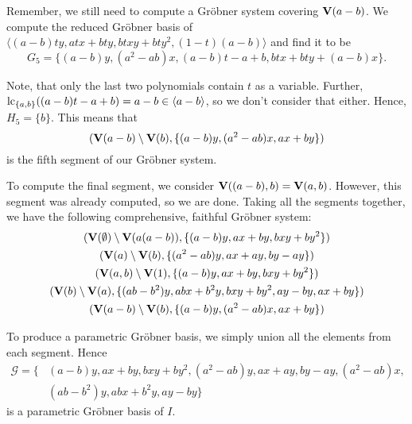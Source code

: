\begin{example}
  Remember, we still need to compute a Gröbner system covering $\operatorname{\mathbf V}(a - b)$. We compute the reduced Gröbner basis of $\langle (a - b)ty, atx + bty, btxy + bty^{2}, (1 - t)(a - b) \rangle$ and find it to be
  \[G_{5} = \{ (a - b)y, (a^2 - ab)x, (a - b)t - a + b, btx + bty + (a - b)x \}.\]

  Note, that only the last two polynomials contain $t$ as a variable. Further, $\operatorname{lc}_{\{a, b\}}((a - b)t - a + b) = a - b \in \langle a - b \rangle$, so we don't consider that either. Hence, $H_{5} = \{b\}$. This means that
  \[(\operatorname{\mathbf V}(a - b) \setminus \operatorname{\mathbf V}(b), \{(a - b)y, (a^2 - ab)x, ax + by \})\]
  is the fifth segment of our Gröbner system.

  To compute the final segment, we consider $\operatorname{\mathbf V}((a - b), b) = \operatorname{\mathbf V}(a, b)$. However, this segment was already computed, so we are done. Taking all the segments together, we have the following comprehensive, faithful Gröbner system:
  \begin{gather*}
    (\operatorname{\mathbf V}(\emptyset) \setminus \operatorname{\mathbf V}(a(a - b)), \{(a - b)y, ax + by, bxy + by^{2}\}) \\
    (\operatorname{\mathbf V}(a) \setminus \operatorname{\mathbf V}(b),\{(a^2 - ab)y, ax + ay, by - ay\} )  \\
    (\operatorname{\mathbf V}(a, b) \setminus \operatorname{\mathbf V}(1), \{(a - b)y, ax + by, bxy + by^2\}) \\
    (\operatorname{\mathbf V}(b) \setminus \operatorname{\mathbf V}(a), \{(ab - b^{2})y, abx + b^{2}y, bxy + by^{2}, ay - by, ax + by\}) \\
    (\operatorname{\mathbf V}(a - b) \setminus \operatorname{\mathbf V}(b), \{(a - b)y, (a^2 - ab)x, ax + by \})
  \end{gather*}

  To produce a parametric Gröbner basis, we simply union all the elements from each segment. Hence
  \begin{align*}
    \mathcal G = \{&(a - b)y, ax + by, bxy + by^{2}, (a^{2} - ab)y, ax + ay, by - ay, (a^{2} - ab)x, \\
                   &(ab - b^{2})y, abx + b^{2}y, ay - by \}
  \end{align*}
  is a parametric Gröbner basis of $I$.

\end{example}

